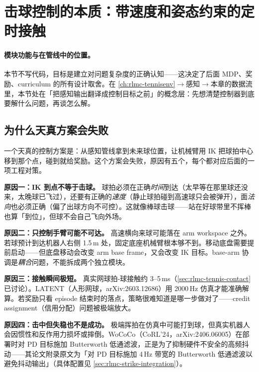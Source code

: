 \section{击球控制的本质：带速度和姿态约束的定时接触}
\label{sec:rlmc-strike-essence}

\paragraph{模块功能与在管线中的位置。}本节不写代码，目标是建立对问题复杂度的正确认知——这决定了后面 MDP、奖励、curriculum 的所有设计取舍。在 \cref{ch:rlmc-tennisenv}$\to$感知$\to$本章的数据流里，本节处在「把感知输出翻译成控制目标之前」的概念层：先想清楚控制器到底要解什么问题，再谈怎么解。

\subsection{为什么天真方案会失败}

一个天真的控制方案是：从感知管线拿到未来球位置，让机械臂用 IK 把球拍中心移到那个点，碰到就给奖励。这个方案会失败，原因有五个，每个都对应后面的一项工程对策。

\textbf{原因一：IK 到点不等于击球。} 球拍必须在正确\emph{时间}到达（太早等在那里球还没来，太晚球已飞过），还要有正确的\emph{速度}（静止球拍碰到高速球只会被弹开），面\emph{法向}也必须正确（偏了出球方向不可控）。这就像棒球击球——站在好球带里不挥棒也算「到位」，但球不会自己飞向外场。

\textbf{原因二：只控制手臂可能不可达。} 高速横向来球可能落在 arm workspace 之外。若球预计到达机器人右侧 1.5\,m 处，固定底座机械臂根本够不到。移动底盘需要提前启动——但底盘移动会改变 arm base frame，又会改变 IK 目标。base-arm 协调是\emph{耦合}问题，不能拆成两个独立模块。

\textbf{原因三：接触瞬间极短。} 真实网球拍-球接触约 3--5\,ms（\cref{sec:rlmc-tennis-contact} 已讨论）。LATENT（人形网球，arXiv:2603.12686）用 2000\,Hz 仿真才能准确解算。若奖励只看 episode 结束时的落点，策略很难知道是哪一步做对了——credit assignment（信用分配）问题被极端放大。

\textbf{原因四：击中但失稳也不是成功。} 极端挥拍在仿真中可能打到球，但真实机器人会因惯性和反作用力损坏或摔倒。WoCoCo（CoRL'24，arXiv:2406.06005）在部署时对 PD 目标施加 Butterworth 低通滤波，正是为了抑制硬件不安全的高频抖动——其论文附录原文为「对 PD 目标施加 4\,Hz 带宽的 Butterworth 低通滤波以避免抖动输出」（具体配置见 \cref{sec:rlmc-strike-integration}）。


